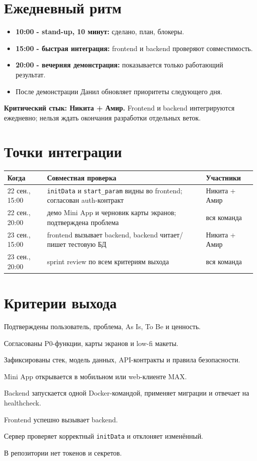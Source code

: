 \documentclass[11pt,a4paper]{article}
\newcommand{\code}[1]{\texttt{#1}}
\begin{document}
\section{Ежедневный ритм}
\begin{itemize}
  \item \textbf{10:00 - stand-up, 10 минут:} сделано, план, блокеры.
  \item \textbf{15:00 - быстрая интеграция:} frontend и backend проверяют совместимость.
  \item \textbf{20:00 - вечерняя демонстрация:} показывается только работающий результат.
  \item После демонстрации Данил обновляет приоритеты следующего дня.
\end{itemize}
\begin{alertbox}\textbf{Критический стык: Никита + Амир.} Frontend и backend интегрируются ежедневно; нельзя ждать окончания разработки отдельных веток.\end{alertbox}

\section{Точки интеграции}
\begin{tabularx}{\textwidth}{p{30mm}X>{\raggedright\arraybackslash}p{37mm}}
\toprule
Когда & Совместная проверка & Участники\\
\midrule
22 сен., 15:00 & \code{initData} и \code{start\_param} видны во frontend; согласован auth-контракт & Никита + Амир\\
22 сен., 20:00 & демо Mini App и черновик карты экранов; подтверждена проблема & вся команда\\
23 сен., 15:00 & frontend вызывает backend, backend читает/пишет тестовую БД & Никита + Амир\\
23 сен., 20:00 & sprint review по всем критериям выхода & вся команда\\
\bottomrule
\end{tabularx}

\section{Критерии выхода}
\begin{tasklist}
  \item Подтверждены пользователь, проблема, As Is, To Be и ценность.
  \item Согласованы P0-функции, карты экранов и low-fi макеты.
  \item Зафиксированы стек, модель данных, API-контракты и правила безопасности.
  \item Mini App открывается в мобильном или web-клиенте MAX.
  \item Backend запускается одной Docker-командой, применяет миграции и отвечает на healthcheck.
  \item Frontend успешно вызывает backend.
  \item Сервер проверяет корректный \code{initData} и отклоняет изменённый.
  \item В репозитории нет токенов и секретов.
\end{tasklist}
\end{document}

